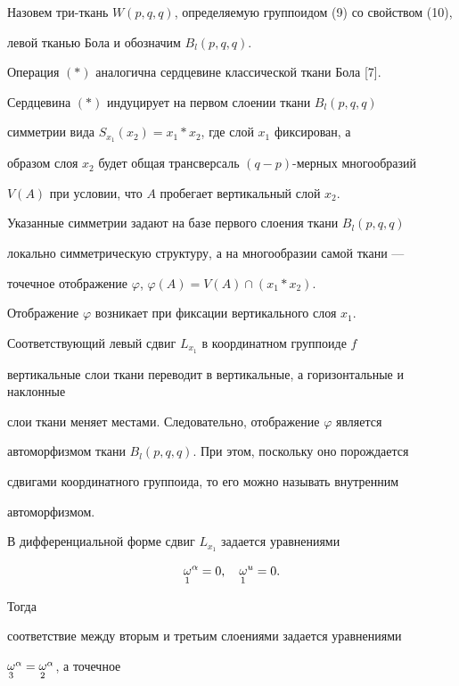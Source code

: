 Назовем три-ткань $W(p,q,q)$, определяемую группоидом (9) со свойством (10),


левой тканью Бола и обозначим $B_{l}(p,q,q)$.





Операция $(*)$ аналогична сердцевине классической ткани Бола [7].


Сердцевина $(*)$ индуцирует на первом слоении ткани $B_{l}(p,q,q)$


симметрии вида $S_{x_1}(x_2)=x_{1}*x_{2}$, где слой $x_1$  фиксирован, а


образом слоя $x_2$ будет общая трансверсаль $(q-p)$-мерных многообразий


$V(A)$ при условии, что $A$ пробегает вертикальный слой $x_2$.


Указанные симметрии задают на базе первого слоения ткани $B_{l}(p,q,q)$


локально симметрическую структуру, а на многообразии самой ткани ---


точечное отображение $\varphi$, $\varphi (A)=V(A)\cap (x_{1}*x_{2})$.





Отображение $\varphi$ возникает при фиксации вертикального слоя $x_1$.


Соответствующий левый сдвиг $L_{x_1}$ в координатном группоиде $f$


вертикальные слои ткани переводит в вертикальные, а горизонтальные и наклонные


слои  ткани меняет местами. Следовательно, отображение $\varphi$ является


автоморфизмом ткани $B_{l}(p,q,q)$. При этом, поскольку оно порождается


сдвигами координатного группоида, то его можно называть внутренним


автоморфизмом.





В дифференциальной форме сдвиг $L_{x_1}$ задается уравнениями


$$


{\crazy{\omega}{1}}^{\alpha}=0, \quad {\crazy{\omega}{1}}^{u}=0.


$$


Тогда


соответствие между вторым и третьим слоениями задается уравнениями


${\displaystyle{\mathop{\omega}_{3}}}^{\alpha}={\displaystyle{\mathop{\omega}_{2}}}^{\alpha}$, а точечное


